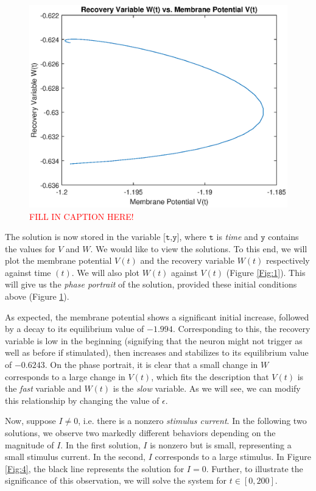 \documentclass{book}
\theoremstyle{definition}
\begin{document}
\begin{figure}[!htb]
	\centering
	\includegraphics[scale=0.6]{FHN_lab/V_W_1.eps}
	\caption{\textcolor{red}{FILL IN CAPTION HERE!}}
	\label{Fig:2}
\end{figure}

The solution is now stored in the variable $\texttt{[t,y]}$, where $\texttt{t}$ is \textit{time} and $\texttt{y}$ contains the values for $V$ and $W$. We would like to view the solutions. To this end, we will plot the membrane potential $V(t)$ and the recovery variable $W(t)$ respectively against time $(t)$. We will also plot $W(t)$ against $V(t)$ (Figure \ref{Fig:1}). This will give us the \textit{phase portrait} of the solution, provided these initial conditions above (Figure \ref{Fig:2}).

As expected, the membrane potential shows a significant initial increase, followed by a decay to its equilibrium value of $-1.994$. Corresponding to this, the recovery variable is low in the beginning (signifying that the neuron might not trigger as well as before if stimulated), then increases and stabilizes to its equilibrium value of $-0.6243$. On the phase portrait, it is clear that a small change in $W$ corresponds to a large change in $V(t)$, which fits the description that $V(t)$ is the \textit{fast} variable and $W(t)$ is the \textit{slow} variable. As we will see, we can modify this relationship by changing the value of $\epsilon$. 

Now, suppose $I \neq 0$, i.e. there is a nonzero \textit{stimulus current}. In the following two solutions, we observe two markedly different behaviors depending on the magnitude of $I$. In the first solution, $I$ is nonzero but is small, representing a small stimulus current. In the second, $I$ corresponds to a large stimulus. In Figure \ref{Fig:4}, the black line represents the solution for $I=0$. Further, to illustrate the significance of this observation, we will solve the system for $t\in [0,200]$. 
\end{document}
